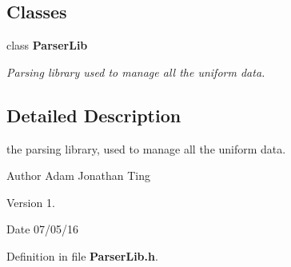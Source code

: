 \subsection*{Classes}
\begin{DoxyCompactItemize}
\item 
class {\bf Parser\-Lib}
\begin{DoxyCompactList}\small\item\em Parsing library used to manage all the uniform data. \end{DoxyCompactList}\end{DoxyCompactItemize}


\subsection{Detailed Description}
the parsing library, used to manage all the uniform data. \begin{DoxyAuthor}{Author}
Adam Jonathan Ting 
\end{DoxyAuthor}
\begin{DoxyVersion}{Version}
1. 
\end{DoxyVersion}
\begin{DoxyDate}{Date}
07/05/16 
\end{DoxyDate}


Definition in file {\bf Parser\-Lib.\-h}.

